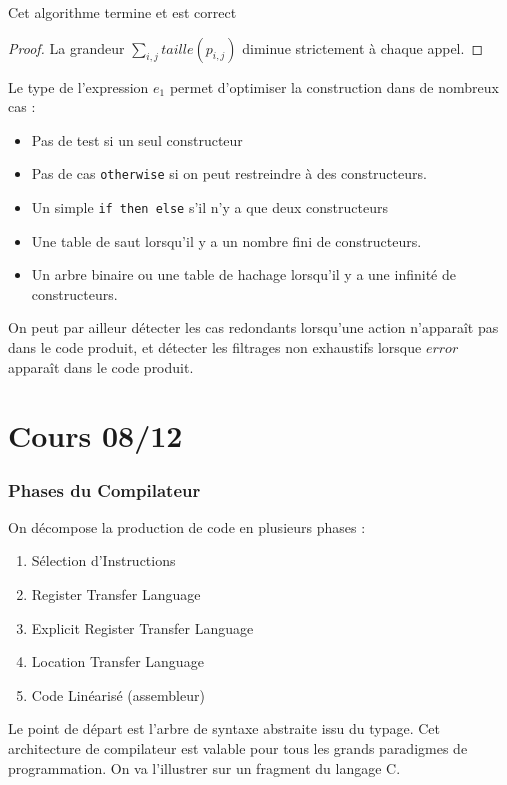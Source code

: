 \documentclass{cours}
\begin{document}
\begin{proposition}
    Cet algorithme termine et est correct
\end{proposition}
\begin{proof}
    La grandeur $\sum_{i, j} taille(p_{i, j})$ diminue strictement à chaque appel.
\end{proof}

Le type de l'expression $e_{1}$ permet d'optimiser la construction dans de nombreux cas :
\begin{itemize}
    \item Pas de test si un seul constructeur
    \item Pas de cas \texttt{otherwise} si on peut restreindre à des constructeurs.
    \item Un simple \texttt{if then else} s'il n'y a que deux constructeurs
    \item Une table de saut lorsqu'il y a un nombre fini de constructeurs.
    \item Un arbre binaire ou une table de hachage lorsqu'il y a une infinité de constructeurs.
\end{itemize}

On peut par ailleur détecter les cas redondants lorsqu'une action n'apparaît pas dans le code produit, et détecter les filtrages non exhaustifs lorsque $error$ apparaît dans le code produit.

\part[Compilateur Optimisant]{Cours 08/12}
\section{Phases du Compilateur}
On décompose la production de code en plusieurs phases :
\begin{enumerate}
    \item Sélection d'Instructions
    \item Register Transfer Language
    \item Explicit Register Transfer Language
    \item Location Transfer Language
    \item Code Linéarisé (assembleur)
\end{enumerate}

Le point de départ est l'arbre de syntaxe abstraite issu du typage. Cet architecture de compilateur est valable pour tous les grands paradigmes de programmation. On va l'illustrer sur un fragment du langage C.
\end{document}
